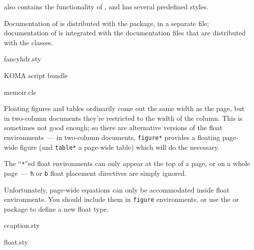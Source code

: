  also contains the functionality of ,
and has several predefined styles.

Documentation of  is distributed with the package,
in a separate file; documentation of  is integrated
with the  documentation files that are distributed with
the  classes.
\begin{ctanrefs}
\item[fancyhdr.sty]
\item[\nothtml{\rmfamily}KOMA script bundle]
\item[memoir.cls]
\end{ctanrefs}


Floating figures and tables ordinarily come out the same width as the
page, but in two-column documents they're restricted to the width of
the column.  This is sometimes not good enough; so there are alternative
versions of the float environments~--- in two-column documents,
\texttt{figure*} provides a floating page-wide figure (and \texttt{table*} a
page-wide table) which will do the necessary.

The ``\texttt{*}''ed float environments can only appear at the top of a page,
or on a whole page~--- \texttt{h} or \texttt{b} float placement directives are
simply ignored.

Unfortunately, page-wide equations can only be accommodated inside
float environments.  You should include them in \texttt{figure} environments,
or use the  or package to define a
new float type. 
\begin{ctanrefs}
\item[ccaption.sty]
\item[float.sty]
\end{ctanrefs}


